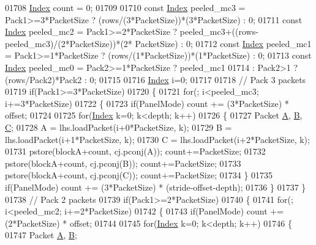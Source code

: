 \begin{DoxyCode}
01708   \hyperlink{namespace_eigen_a62e77e0933482dafde8fe197d9a2cfde}{Index} count = 0;
01709 
01710   \textcolor{keyword}{const} \hyperlink{namespace_eigen_a62e77e0933482dafde8fe197d9a2cfde}{Index} peeled\_mc3 = Pack1>=3*PacketSize ? (rows/(3*PacketSize))*(3*PacketSize) : 0;
01711   \textcolor{keyword}{const} \hyperlink{namespace_eigen_a62e77e0933482dafde8fe197d9a2cfde}{Index} peeled\_mc2 = Pack1>=2*PacketSize ? peeled\_mc3+((rows-peeled\_mc3)/(2*PacketSize))*(2*
      PacketSize) : 0;
01712   \textcolor{keyword}{const} \hyperlink{namespace_eigen_a62e77e0933482dafde8fe197d9a2cfde}{Index} peeled\_mc1 = Pack1>=1*PacketSize ? (rows/(1*PacketSize))*(1*PacketSize) : 0;
01713   \textcolor{keyword}{const} \hyperlink{namespace_eigen_a62e77e0933482dafde8fe197d9a2cfde}{Index} peeled\_mc0 = Pack2>=1*PacketSize ? peeled\_mc1
01714                          : Pack2>1             ? (rows/Pack2)*Pack2 : 0;
01715 
01716   \hyperlink{namespace_eigen_a62e77e0933482dafde8fe197d9a2cfde}{Index} i=0;
01717 
01718   \textcolor{comment}{// Pack 3 packets}
01719   \textcolor{keywordflow}{if}(Pack1>=3*PacketSize)
01720   \{
01721     \textcolor{keywordflow}{for}(; i<peeled\_mc3; i+=3*PacketSize)
01722     \{
01723       \textcolor{keywordflow}{if}(PanelMode) count += (3*PacketSize) * offset;
01724 
01725       \textcolor{keywordflow}{for}(\hyperlink{namespace_eigen_a62e77e0933482dafde8fe197d9a2cfde}{Index} k=0; k<depth; k++)
01726       \{
01727         Packet \hyperlink{group___core___module_class_eigen_1_1_matrix}{A}, \hyperlink{group___core___module_class_eigen_1_1_matrix}{B}, \hyperlink{group___core___module}{C};
01728         A = lhs.loadPacket(i+0*PacketSize, k);
01729         B = lhs.loadPacket(i+1*PacketSize, k);
01730         C = lhs.loadPacket(i+2*PacketSize, k);
01731         pstore(blockA+count, cj.pconj(A)); count+=PacketSize;
01732         pstore(blockA+count, cj.pconj(B)); count+=PacketSize;
01733         pstore(blockA+count, cj.pconj(C)); count+=PacketSize;
01734       \}
01735       \textcolor{keywordflow}{if}(PanelMode) count += (3*PacketSize) * (stride-offset-depth);
01736     \}
01737   \}
01738   \textcolor{comment}{// Pack 2 packets}
01739   \textcolor{keywordflow}{if}(Pack1>=2*PacketSize)
01740   \{
01741     \textcolor{keywordflow}{for}(; i<peeled\_mc2; i+=2*PacketSize)
01742     \{
01743       \textcolor{keywordflow}{if}(PanelMode) count += (2*PacketSize) * offset;
01744 
01745       \textcolor{keywordflow}{for}(\hyperlink{namespace_eigen_a62e77e0933482dafde8fe197d9a2cfde}{Index} k=0; k<depth; k++)
01746       \{
01747         Packet \hyperlink{group___core___module_class_eigen_1_1_matrix}{A}, \hyperlink{group___core___module_class_eigen_1_1_matrix}{B};

\end{DoxyCode}
